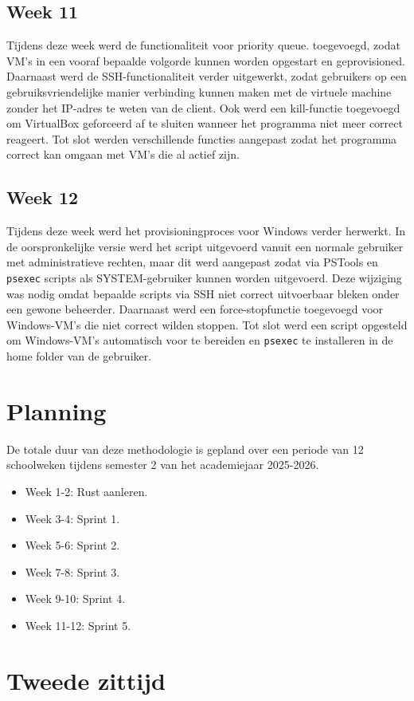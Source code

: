 \subsection{Week 11}
Tijdens deze week werd de functionaliteit voor priority queue. toegevoegd, zodat VM's in een vooraf bepaalde volgorde kunnen worden opgestart en geprovisioned. Daarnaast werd de SSH-functionaliteit verder uitgewerkt, zodat gebruikers op een gebruiksvriendelijke manier verbinding kunnen maken met de virtuele machine zonder het IP-adres te weten van de client. Ook werd een kill-functie toegevoegd om VirtualBox geforceerd af te sluiten wanneer het programma niet meer correct reageert. Tot slot werden verschillende functies aangepast zodat het programma correct kan omgaan met VM's die al actief zijn.

\subsection{Week 12}
Tijdens deze week werd het provisioningproces voor Windows verder herwerkt. In de oorspronkelijke versie werd het script uitgevoerd vanuit een normale gebruiker met administratieve rechten, maar dit werd aangepast zodat via PSTools en \texttt{psexec} scripts als SYSTEM-gebruiker kunnen worden uitgevoerd. Deze wijziging was nodig omdat bepaalde scripts via SSH niet correct uitvoerbaar bleken onder een gewone beheerder. Daarnaast werd een force-stopfunctie toegevoegd voor Windows-VM's die niet correct wilden stoppen. Tot slot werd een script opgesteld om Windows-VM's automatisch voor te bereiden en \texttt{psexec} te installeren in de home folder van de gebruiker.

\section{Planning}
De totale duur van deze methodologie is gepland over een periode van 12 schoolweken tijdens semester 2 van het academiejaar 2025-2026.
\begin{itemize}
    \item Week 1-2: Rust aanleren.
    \item Week 3-4: Sprint 1.
    \item Week 5-6: Sprint 2.
    \item Week 7-8: Sprint 3.
    \item Week 9-10: Sprint 4.
    \item Week 11-12: Sprint 5.
\end{itemize}

\section{Tweede zittijd}




